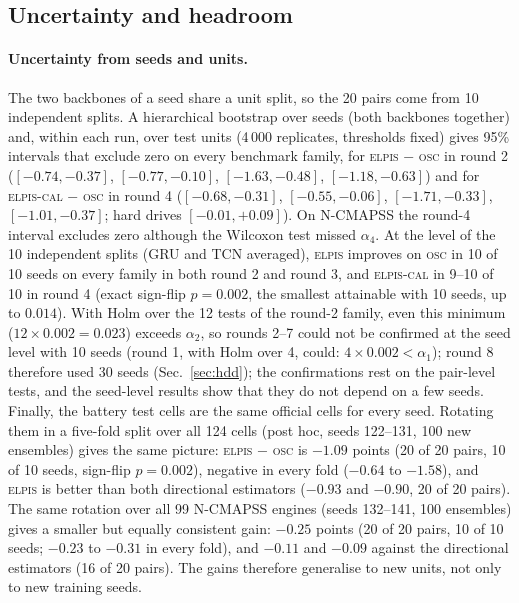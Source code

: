 \documentclass{esannV2}
\newcommand{\OSC}{\textsc{osc}}
\newcommand{\RPT}{\textsc{elpis}}
\newcommand{\AUTO}{\textsc{elpis-cal}}
\begin{document}
\subsection{Uncertainty and headroom}
\paragraph{Uncertainty from seeds and units.} The two backbones of a seed share a unit split, so the 20 pairs come from 10 independent splits. A hierarchical bootstrap over seeds (both backbones together) and, within each run, over test units (4\,000 replicates, thresholds fixed) gives 95\% intervals that exclude zero on every benchmark family, for \RPT{} $-$ \OSC{} in round 2 ($[-0.74,-0.37]$, $[-0.77,-0.10]$, $[-1.63,-0.48]$, $[-1.18,-0.63]$) and for \AUTO{} $-$ \OSC{} in round 4 ($[-0.68,-0.31]$, $[-0.55,-0.06]$, $[-1.71,-0.33]$, $[-1.01,-0.37]$; hard drives $[-0.01,+0.09]$). On N-CMAPSS the round-4 interval excludes zero although the Wilcoxon test missed $\alpha_4$. At the level of the 10 independent splits (GRU and TCN averaged), \RPT{} improves on \OSC{} in 10 of 10 seeds on every family in both round 2 and round 3, and \AUTO{} in 9--10 of 10 in round 4 (exact sign-flip $p=0.002$, the smallest attainable with 10 seeds, up to $0.014$). With Holm over the 12 tests of the round-2 family, even this minimum ($12\times0.002=0.023$) exceeds $\alpha_2$, so rounds 2--7 could not be confirmed at the seed level with 10 seeds (round 1, with Holm over 4, could: $4\times0.002<\alpha_1$); round 8 therefore used 30 seeds (Sec.~\ref{sec:hdd}); the confirmations rest on the pair-level tests, and the seed-level results show that they do not depend on a few seeds. Finally, the battery test cells are the same official cells for every seed. Rotating them in a five-fold split over all 124 cells (post hoc, seeds 122--131, 100 new ensembles) gives the same picture: \RPT{} $-$ \OSC{} is $-1.09$ points (20 of 20 pairs, 10 of 10 seeds, sign-flip $p=0.002$), negative in every fold ($-0.64$ to $-1.58$), and \RPT{} is better than both directional estimators ($-0.93$ and $-0.90$, 20 of 20 pairs). The same rotation over all 99 N-CMAPSS engines (seeds 132--141, 100 ensembles) gives a smaller but equally consistent gain: $-0.25$ points (20 of 20 pairs, 10 of 10 seeds; $-0.23$ to $-0.31$ in every fold), and $-0.11$ and $-0.09$ against the directional estimators (16 of 20 pairs). The gains therefore generalise to new units, not only to new training seeds.
\end{document}
